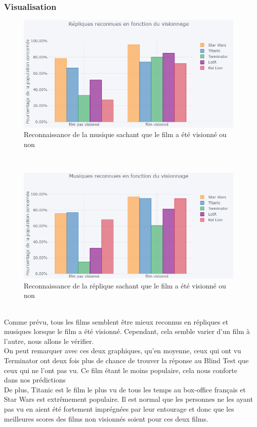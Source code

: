 \documentclass{article} %
\begin{document}
\subsubsection{Visualisation}
\begin{figure}[!h]
	\includegraphics[keepaspectratio,scale=0.9]{h7.png}
	\caption{Reconnaissance de la musique sachant que le film a été visionné ou non}
\end{figure}~\\
\begin{figure}[!h]
	\includegraphics[keepaspectratio,scale=0.9]{h61.png}
	\caption{Reconnaissance de la réplique sachant que le film a été visionné ou non}
\end{figure}~\\
Comme prévu, tous les films semblent être mieux reconnus en répliques et musiques lorsque le film a été visionné. Cependant, cela semble varier d’un film à l’autre, nous allons le vérifier. 
\\
On peut remarquer avec ces deux graphiques, qu'en moyenne, ceux qui ont vu Terminator ont deux fois plus de chance de trouver la réponse au Blind Test que ceux qui ne l'ont pas vu. Ce film étant le moins populaire, cela nous conforte dans nos prédictions
\\
De plus, Titanic est le film le plus vu de tous les temps au box-office français et Star Wars est extrêmement populaire. Il est normal que les personnes ne les ayant pas vu en aient été fortement imprégnées par leur entourage et donc que les meilleures scores des films non visionnés soient pour ces deux films.
\\
\end{document}
